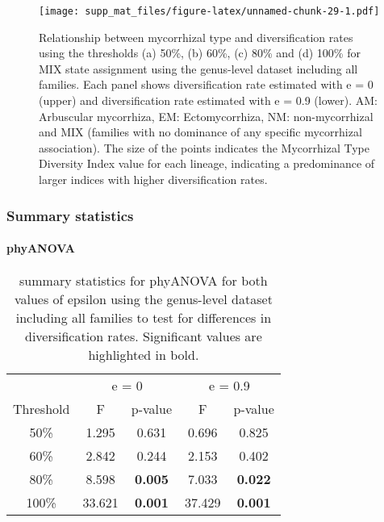 \documentclass[]{article}
\let\oldparagraph\paragraph
\renewcommand{\paragraph}[1]{\oldparagraph{#1}\mbox{}}
\begin{document}
\begin{figure}
\centering
\texttt{[image: supp\_mat\_files/figure-latex/unnamed-chunk-29-1.pdf]}
\caption{Relationship between mycorrhizal type and diversification rates
using the thresholds (a) 50\%, (b) 60\%, (c) 80\% and (d) 100\% for MIX
state assignment using the genus-level dataset including all families.
Each panel shows diversification rate estimated with e = 0 (upper) and
diversification rate estimated with e = 0.9 (lower). AM: Arbuscular
mycorrhiza, EM: Ectomycorrhiza, NM: non-mycorrhizal and MIX (families
with no dominance of any specific mycorrhizal association). The size of
the points indicates the Mycorrhizal Type Diversity Index value for each
lineage, indicating a predominance of larger indices with higher
diversification rates.}
\end{figure}

\hypertarget{summary-statistics}{%
\subsubsection{Summary statistics}\label{summary-statistics}}

\hypertarget{phyanova-6}{%
\paragraph{phyANOVA}\label{phyanova-6}}

\begin{table}[H]

\caption{\label{tab:unnamed-chunk-30}summary statistics for phyANOVA for both values of epsilon using the genus-level dataset including all families to test for differences in diversification rates. Significant values are highlighted in bold.}
\centering
\begin{tabular}{c|c|c|c|c}
\hline
\multicolumn{1}{c|}{ } & \multicolumn{2}{c|}{e = 0} & \multicolumn{2}{c}{e = 0.9} \\
\cline{2-3} \cline{4-5}
Threshold & F & p-value & F & p-value\\
\hline
50\% & 1.295 & 0.631 & 0.696 & 0.825\\
\hline
60\% & 2.842 & 0.244 & 2.153 & 0.402\\
\hline
80\% & 8.598 & \textbf{0.005} & 7.033 & \textbf{0.022}\\
\hline
100\% & 33.621 & \textbf{0.001} & 37.429 & \textbf{0.001}\\
\hline
\end{tabular}
\end{table}
\end{document}
